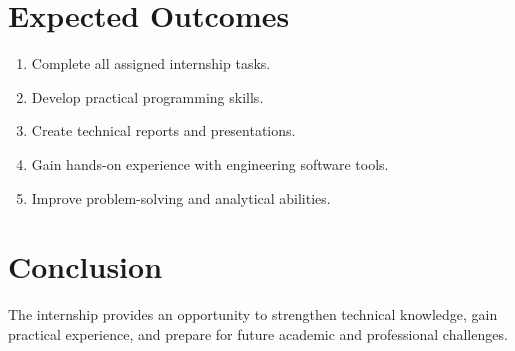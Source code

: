\documentclass[a4paper,12pt]{article}
\begin{document}
	\section{Expected Outcomes}
	
	\begin{enumerate}
		\item Complete all assigned internship tasks.
		\item Develop practical programming skills.
		\item Create technical reports and presentations.
		\item Gain hands-on experience with engineering software tools.
		\item Improve problem-solving and analytical abilities.
	\end{enumerate}
	
	\section{Conclusion}
	
	The internship provides an opportunity to strengthen technical knowledge, gain practical experience, and prepare for future academic and professional challenges.
	
\end{document}
